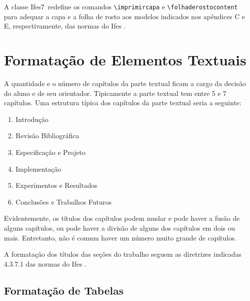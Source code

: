 \documentclass[12pt,times,a4paper,english,brazil,
chapter=TITLE,section=TITLE,subsection=TITLE]{ifes7}
\newcommand{\ifestex}{\textsf{Ifes$7$}}
\begin{document}
A classe \ifestex\ redefine os comandos \verb!\imprimircapa! e
\verb!\folhaderostocontent! para adequar a capa e a folha de rosto aos
modelos indicados nos apêndices C e E, respectivamente, das normas do
Ifes \cite{Ifes2014}.



\chapter{Formatação de Elementos Textuais}
\label{cha:format-text}

A quantidade e o número de capítulos da parte textual ficam a cargo da
decisão do aluno e de seu orientador. Tipicamente a parte textual tem
entre 5 e 7 capítulos. Uma estrutura típica dos capítulos da parte
textual seria a seguinte:

\begin{SingleSpace}
  \begin{enumerate}
  \item Introdução
  \item Revisão Bibliográfica
  \item Especificação e Projeto
  \item Implementação
  \item Experimentos e Resultados
  \item Conclusões e Trabalhos Futuros
  \end{enumerate}
\end{SingleSpace}

Evidentemente, os títulos dos capítulos podem mudar e pode haver a
fusão de alguns capítulos, ou pode haver a divisão de alguns dos
capítulos em dois ou mais. Entretanto, não é comum haver um número
muito grande de capítulos.

A formatação dos títulos das seções do trabalho seguem as diretrizes
indicadas 4.3.7.1 das normas do Ifes \cite[p.~34]{Ifes2014}.



\section{Formatação de Tabelas}
\label{sec:format-tabelas}
\end{document}
